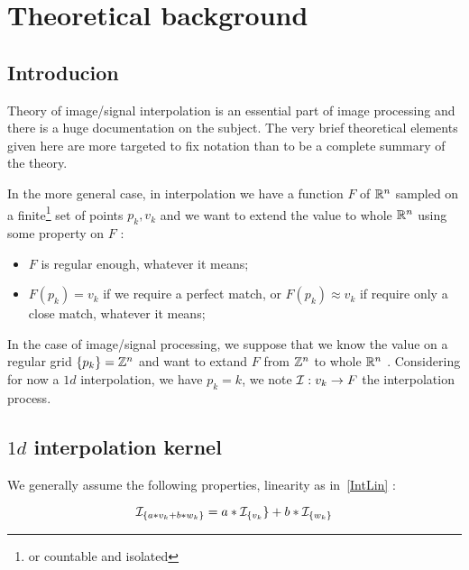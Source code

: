 
\section{Theoretical background}

\subsection{Introducion}

Theory of image/signal interpolation is an essential  part of image processing and there is a huge 
documentation on the subject. The very brief theoretical elements given here are more targeted to fix notation
than to be a complete summary of the theory.

In the more general case, in interpolation we have a function $F$  of $\mathbb{R}^n$ sampled on a finite\footnote{or countable and isolated}
 set of points $p_k,v_k$ and we want to extend the value to whole
$\mathbb{R}^n$  using some  property on $F$ :

\begin{itemize}
   \item $F$ is regular enough, whatever it means;
   \item $F(p_k) = v_k$ if we require a perfect match, or $F(p_k) \approx v_k$  if require only a close
         match,  whatever it means;
\end{itemize}



In the case of image/signal processing, we suppose that we know the value on a regular grid $\{p_k\}=\mathbb{Z}^n$
and want to extand $F$ from $\mathbb{Z}^n$ to whole $\mathbb{R}^n$ . 
Considering for now a $1d$ interpolation, we have $p_k=k$, we note $\mathcal I :  {v_k}  \rightarrow F$ 
the interpolation process.  


\subsection{$1d$ interpolation kernel}

We generally assume the following properties, linearity as in~\ref{IntLin} :

\begin{equation}
    \mathcal I_{\{a*v_k+b*w_k\}} = a*\mathcal I_{\{v_k}\}+ b*\mathcal I_{\{w_k\}} \label{IntLin}
\end{equation}

